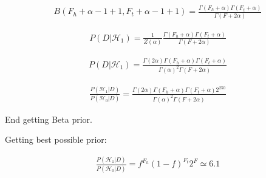 \documentclass[12pt]{article}
\begin{document}
\begin{gather}
B(F_h+\alpha-1+1,F_t+\alpha-1+1) = \frac{\Gamma(F_h+\alpha)\Gamma(F_t+\alpha)}{\Gamma(F+2\alpha)}
\end{gather}

\begin{gather}
P(D|\mathcal{H}_1) = \frac{1}{Z(\alpha)} \frac{\Gamma(F_h+\alpha)\Gamma(F_t+\alpha)}{\Gamma(F+2\alpha)}
\end{gather}

\begin{gather}
P(D|\mathcal{H}_1) = \frac{\Gamma(2\alpha)\Gamma(F_h+\alpha)\Gamma(F_t+\alpha)}{\Gamma(\alpha)^2\Gamma(F+2\alpha)}
\end{gather}

\begin{gather}
\frac{P(\mathcal{H}_1 | D)}{P(\mathcal{H}_0 | D)} =
\frac{\Gamma(2\alpha)\Gamma(F_h+\alpha)\Gamma(F_t+\alpha)2^{250}}
{\Gamma(\alpha)^2\Gamma(F+2\alpha)}
\end{gather}

End getting Beta prior.
 
Getting best possible prior:
 
\begin{gather}
 \frac{P(\mathcal{H}_1 | D)}{P(\mathcal{H}_0 | D)} =
 f^{F_h}(1-f)^{F_t}2^F \simeq 6.1
\end{gather}
\end{document}
